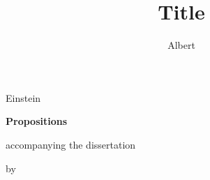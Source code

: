 \documentclass{dissertation}
\begin{document}
\title[Optional Subtitle]{Title}
\author{Albert}{Einstein}

\begin{center}

{\Large\titlefont\bfseries Propositions}

\bigskip

accompanying the dissertation

\bigskip

{\makeatletter
\titlestyle\bfseries\large\@title
\makeatother}

{\makeatletter
\ifx\@subtitle\undefined\else
    \titlefont\titleshape\@subtitle
\fi
\makeatother}

\bigskip

by

\bigskip

\makeatletter
{\large\titlefont\bfseries\@firstname\ {\titleshape\@lastname}}
\makeatother

\end{center}

\bigskip
\bigskip
\end{document}
